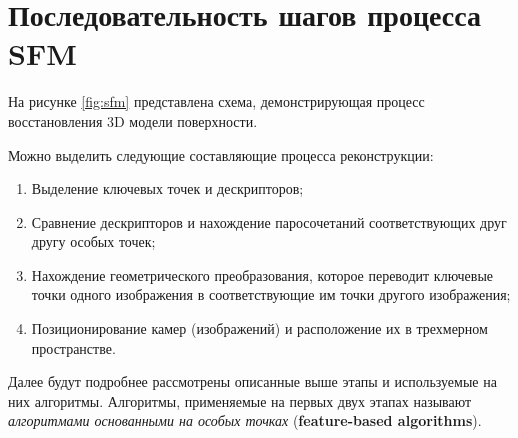 \section{Последовательность шагов процесса SFM}

На рисунке \ref{fig:sfm} представлена схема, демонстрирующая процесс восстановления 3D модели поверхности. 

\vspace{1em}
Можно выделить следующие составляющие процесса реконструкции: 
\begin{enumerate}
    \item Выделение ключевых точек и дескрипторов;
    \item Сравнение дескрипторов и нахождение паросочетаний соответствующих друг другу особых точек;
    \item Нахождение геометрического преобразования, которое переводит ключевые точки одного изображения в соответствующие им точки другого изображения;
    \item Позиционирование камер (изображений) и расположение их в трехмерном пространстве.
\end{enumerate}

\vspace{1em}
Далее будут подробнее рассмотрены описанные выше этапы и используемые на них алгоритмы. Алгоритмы, применяемые на первых двух этапах называют \textit{алгоритмами основанными на особых точках} (\textbf{feature-based algorithms}).
